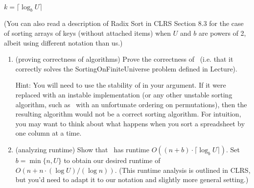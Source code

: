\documentclass[11pt]{article}
\begin{document}
\begin{enumerate}
\begin{algorithm}[H]
\\
$k=\lceil \log_b U\rceil$\;
\caption{Radix Sort}
\end{algorithm}

(You can also read a description of Radix Sort in CLRS Section 8.3 for the case of sorting arrays of keys (without attached items) when $U$ and $b$ are powers of 2, albeit using different notation than us.)

        \begin{enumerate}
        
            \item (proving correctness of algorithms) Prove the correctness of \RadixSort\ (i.e. that it correctly solves the SortingOnFiniteUniverse problem defined in Lecture). 
            
            Hint: You will need to use the stability of \SingletonBucketSort in your argument. If it were replaced with an instable implementation (or any other unstable sorting algorithm, such as \ExhaustiveSearchSort\ with an unfortunate ordering on permutations), then the resulting algorithm would not be a correct sorting algorithm.   For intuition, you may want to think about what happens when you sort a spreadsheet by one column at a time. 
            
            \item (analyzing runtime) Show that \RadixSort\ has runtime $O((n+b)\cdot \lceil \log_b U\rceil)$.  Set $b=\min\{n,U\}$ to obtain our desired runtime of $O(n+n\cdot (\log U)/(\log n))$.  (This runtime analysis is outlined in CLRS, but you'd need to adapt it to our notation and slightly more general setting.) 
          
        \end{enumerate}


\end{enumerate}
\end{document}
